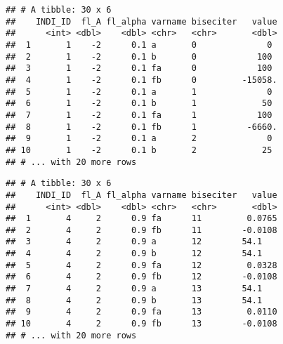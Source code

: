 \documentclass[
]{book}
\newenvironment{Shaded}{\begin{snugshade}}{\end{snugshade}}
\newcommand{\DecValTok}[1]{\textcolor[rgb]{0.00,0.00,0.81}{#1}}
\newcommand{\KeywordTok}[1]{\textcolor[rgb]{0.13,0.29,0.53}{\textbf{#1}}}
\newcommand{\NormalTok}[1]{#1}
\newcommand{\OperatorTok}[1]{\textcolor[rgb]{0.81,0.36,0.00}{\textbf{#1}}}
\newcommand{\StringTok}[1]{\textcolor[rgb]{0.31,0.60,0.02}{#1}}
\begin{document}
\begin{Shaded}
\end{Shaded}

\begin{verbatim}
## # A tibble: 30 x 6
##    INDI_ID  fl_A fl_alpha varname biseciter   value
##      <int> <dbl>    <dbl> <chr>   <chr>       <dbl>
##  1       1    -2      0.1 a       0              0 
##  2       1    -2      0.1 b       0            100 
##  3       1    -2      0.1 fa      0            100 
##  4       1    -2      0.1 fb      0         -15058.
##  5       1    -2      0.1 a       1              0 
##  6       1    -2      0.1 b       1             50 
##  7       1    -2      0.1 fa      1            100 
##  8       1    -2      0.1 fb      1          -6660.
##  9       1    -2      0.1 a       2              0 
## 10       1    -2      0.1 b       2             25 
## # ... with 20 more rows
\end{verbatim}

\begin{Shaded}
\end{Shaded}

\begin{verbatim}
## # A tibble: 30 x 6
##    INDI_ID  fl_A fl_alpha varname biseciter   value
##      <int> <dbl>    <dbl> <chr>   <chr>       <dbl>
##  1       4     2      0.9 fa      11         0.0765
##  2       4     2      0.9 fb      11        -0.0108
##  3       4     2      0.9 a       12        54.1   
##  4       4     2      0.9 b       12        54.1   
##  5       4     2      0.9 fa      12         0.0328
##  6       4     2      0.9 fb      12        -0.0108
##  7       4     2      0.9 a       13        54.1   
##  8       4     2      0.9 b       13        54.1   
##  9       4     2      0.9 fa      13         0.0110
## 10       4     2      0.9 fb      13        -0.0108
## # ... with 20 more rows
\end{verbatim}
\end{document}
